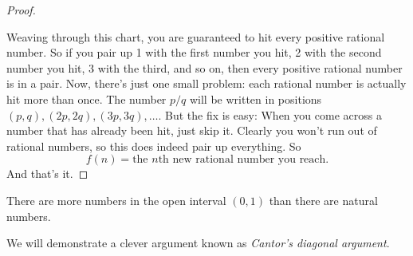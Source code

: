 \documentclass[11pt,twoside=off,numbers=noenddot]{scrbook}
\begin{document}
\begin{proof}
\begin{figure}[h]
    \end{figure}

    Weaving through this chart, you are guaranteed to hit every positive rational number. So if you pair up 1 with the first number you hit, 2 with the second number you hit, 3 with the third, and so on, then every positive rational number is in a pair. Now, there's just one small problem: each rational number is actually hit more than once. The number $p/q$ will be written in positions $(p, q), (2p, 2q), (3p, 3q), \dots$. But the fix is easy: When you come across a number that has already been hit, just skip it. Clearly you won't run out of rational numbers, so this does indeed pair up everything. So
    \[ f(n) = \text{the $n$th new rational number you reach}. \]
    And that's it.
\end{proof}

\begin{theorem}
    There are more numbers in the open interval $(0, 1)$ than there are natural numbers.
\end{theorem}

We will demonstrate a clever argument known as \textit{Cantor's diagonal argument}.
\end{document}
